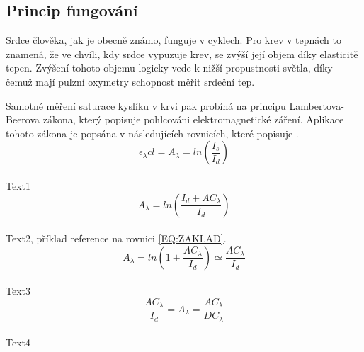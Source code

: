 \subsection {Princip fungování}
Srdce člověka, jak je obecně známo, funguje v cyklech. Pro krev v tepnách to znamená, že ve chvíli, kdy srdce vypuzuje krev, se zvýší její objem díky elasticitě tepen. Zvýšení tohoto objemu logicky vede k nižší propustnosti světla, díky čemuž mají pulzní oxymetry schopnost měřit srdeční tep.
\par Samotné měření saturace kyslíku v krvi pak probíhá na principu Lambertova-Beerova zákona, který popisuje pohlcováni elektromagnetické záření. Aplikace tohoto zákona je popsána v následujících rovnicích, které popisuje \cite{KYRIACOU}.
\begin{equation}%
  {\epsilon_{\lambda}cl} = A_{\lambda} = ln(\frac{I_s}{I_d})  
\end{equation}\\
Text1\\
\begin{equation}
    A_{\lambda} = ln(\frac{I_d+AC_{\lambda}}{I_d})
    \label{EQ:ZAKLAD}
\end{equation}\\
Text2, příklad reference na rovnici \ref{EQ:ZAKLAD}.\\
\begin{equation}
    A_{\lambda} = ln(1+\frac{AC_{\lambda}}{I_d}) \simeq \frac{AC_{\lambda}}{I_d}
\end{equation}\\
Text3\\
\begin{equation}
    \frac{AC_{\lambda}}{I_d} = A_{\lambda} = \frac{AC_{\lambda}}{DC_{\lambda}}\end{equation}\\
Text4\\
 

